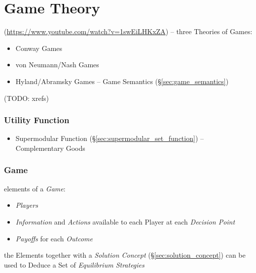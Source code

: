 \part{Game Theory}\label{sec:game_theory}

(\url{https://www.youtube.com/watch?v=1swEiLHKxZA}) -- three Theories of Games:
\begin{itemize}
  \item Conway Games
  \item von Neumann/Nash Games
  \item Hyland/Abramsky Games -- Game Semantics (\S\ref{sec:game_semantics})
\end{itemize}
(TODO: xrefs)



\section{Utility Function}\label{sec:utility_function}


\begin{itemize}
  \item Supermodular Function (\S\ref{sec:supermodular_set_function}) --
    Complementary Goods
\end{itemize}



\section{Game}\label{sec:game}

elements of a \emph{Game}:
\begin{itemize}
  \item \emph{Players}
  \item \emph{Information} and \emph{Actions} available to each Player at each
    \emph{Decision Point}
  \item \emph{Payoffs} for each \emph{Outcome}
\end{itemize}
the Elements together with a \emph{Solution Concept}
(\S\ref{sec:solution_concept}) can be used to Deduce a Set of \emph{Equilibrium
  Strategies}

